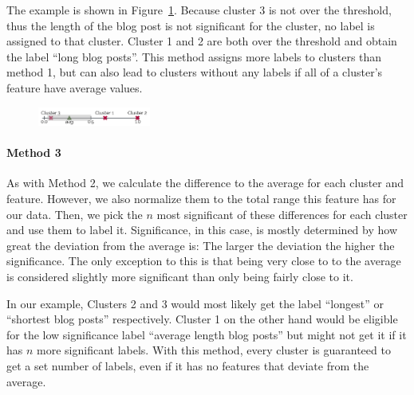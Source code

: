 The example is shown in Figure~\ref{cluster_labeling_2}.
Because cluster 3 is not over the threshold, thus the length of the blog post is not significant for the cluster, no label is assigned to that cluster.
Cluster 1 and 2 are both over the threshold and obtain the label ``long blog posts''.
This method assigns more labels to clusters than method 1, but can also lead to clusters without any labels if all of a cluster's feature have average values.

\begin{figure}[ht]
	\centering
	\includegraphics[width=0.33\textwidth]{images/cluster_labeling_2.pdf}
	\caption{}
	\label{cluster_labeling_2}
\end{figure}

\paragraph{Method 3}
As with Method 2, we calculate the difference to the average for each cluster and feature.
However, we also normalize them to the total range this feature has for our data.
Then, we pick the $n$ most significant of these differences for each cluster and use them to label it.
Significance, in this case, is mostly determined by how great the deviation from the average is: The larger the deviation the higher the significance.
The only exception to this is that being very close to to the average is considered slightly more significant than only being fairly close to it.

In our example, Clusters 2 and 3 would most likely get the label ``longest'' or ``shortest blog posts'' respectively.
Cluster 1 on the other hand would be eligible for the low significance label ``average length blog posts'' but might not get it if it has $n$ more significant labels.
With this method, every cluster is guaranteed to get a set number of labels, even if it has no features that deviate from the average.

